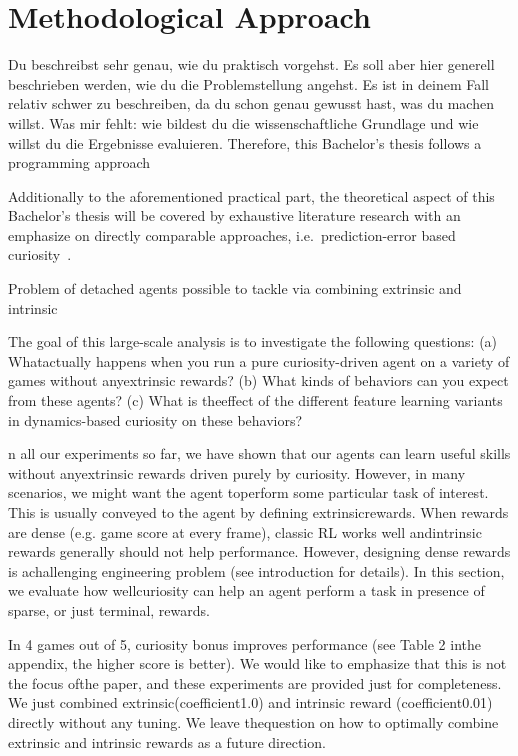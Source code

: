 \documentclass[draft,final]{vutinfth} %
\begin{document}
    \section{Methodological Approach}\label{sec:methodological-approach}


    Du beschreibst sehr genau, wie du praktisch vorgehst. Es soll aber hier generell beschrieben werden, wie du die Problemstellung angehst. Es ist in deinem Fall relativ schwer zu beschreiben, da du schon genau gewusst hast, was du machen willst. Was mir fehlt: wie bildest du die wissenschaftliche Grundlage und wie willst du die Ergebnisse evaluieren.
    Therefore, this Bachelor's thesis follows a programming approach

    Additionally to the aforementioned practical part, the theoretical aspect of this Bachelor's thesis will be covered by exhaustive literature research with an emphasize on directly comparable approaches, i.e.\ prediction-error based curiosity~\citep{burda_large-scale_2018-1}.


    Problem of detached agents possible to tackle via combining extrinsic and intrinsic


    The goal of this large-scale analysis is to investigate the following questions: (a) Whatactually happens when you run a pure curiosity-driven agent on a variety of games without anyextrinsic rewards? (b) What kinds of behaviors can you expect from these agents? (c) What is theeffect of the different feature learning variants in dynamics-based curiosity on these behaviors?


    n all our experiments so far, we have shown that our agents can learn useful skills without anyextrinsic rewards driven purely by curiosity. However, in many scenarios, we might want the agent toperform some particular task of interest. This is usually conveyed to the agent by defining extrinsicrewards. When rewards are dense (e.g. game score at every frame), classic RL works well andintrinsic rewards generally should not help performance. However, designing dense rewards is achallenging engineering problem (see introduction for details). In this section, we evaluate how wellcuriosity can help an agent perform a task in presence of sparse, or just terminal, rewards.

    In 4 games out of 5, curiosity bonus improves performance (see Table 2 inthe appendix, the higher score is better). We would like to emphasize that this is not the focus ofthe paper, and these experiments are provided just for completeness. We just combined extrinsic(coefficient1.0) and intrinsic reward (coefficient0.01) directly without any tuning. We leave thequestion on how to optimally combine extrinsic and intrinsic rewards as a future direction.
\end{document}

